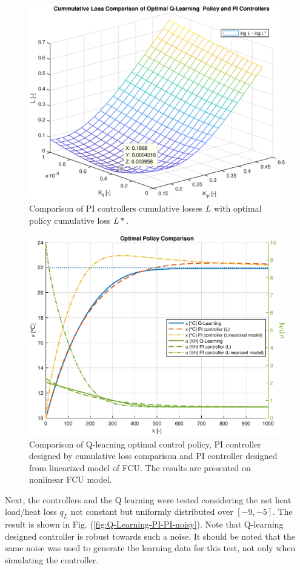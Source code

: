 \documentclass{ifacconf}
\begin{document}
\begin{figure}
\centering{}\includegraphics[width=0.95\columnwidth]{figures/q_learning_vs_pi_contr}
\caption{\label{fig:Comparison-of-PI-Q-Learning}Comparison of PI controllers
cumulative losses $L$ with optimal policy cumulative loss $L*$.}
\end{figure}
\begin{figure}
\centering{}\includegraphics[width=0.95\columnwidth]{figures/optimal_policy}
\caption{\label{fig:Q-Learning-PI-PI}Comparison of Q-learning optimal control
policy, PI controller designed by cumulative loss comparison and PI
controller designed from linearized model of FCU. The results are
presented on nonlinear FCU model.}
\end{figure}
Next, the controllers and the Q learning were tested considering the
net heat load/heat loss $q_{L}$ not constant but uniformly distributed
over $\left[-9,-5\right]$. The result is shown in Fig. (\ref{fig:Q-Learning-PI-PI-noisy}).
Note that Q-learning designed controller is robust towards such a
noise. It should be noted that the same noise was used to generate
the learning data for this test, not only when simulating the controller.
\end{document}
